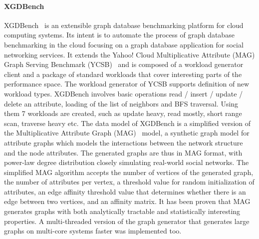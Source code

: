 \paragraph{XGDBench} XGDBench~\cite{Dayarathna:2014:GDB:2676904.2676939} is an extensible graph database benchmarking platform for cloud computing systems. Its intent is to automate
the process of graph database benchmarking in the cloud focusing on a graph database application for social networking services. It extends the Yahoo! Cloud Multiplicative Attribute (MAG) Graph Serving Benchmark (YCSB)~\cite{Cooper:2010:BCS:1807128.1807152} and is composed of a workload generator client and a package of standard workloads that cover interesting parts of the performance space.
The workload generator of YCSB supports definition of new workload types. XGDBench involves basic operations read / insert / update / delete an attribute, loading of the list of neighbors and BFS traversal. Using them 7 workloads are created, such as update heavy, read mostly, short range scan, traverse heavy etc.
The data model of XGDBench is a simplified version of the Multiplicative Attribute Graph (MAG)~\cite{Kim2010} model, a synthetic graph model for attribute graphs which models the interactions between the network structure and the node attributes.
The generated graphs are thus in MAG format, with power-law degree distribution closely simulating real-world social networks.
The simplified MAG algorithm accepts the number of vertices of the generated graph, the number of attributes per vertex, a threshold value for random initialization of attributes, an edge affinity threshold value that determines whether there is an edge between two vertices, and an affinity matrix. It has been proven that MAG generates graphs with both analytically tractable and statistically interesting properties. A multi-threaded version of the graph generator that generates large graphs on multi-core systems faster was implemented too.


